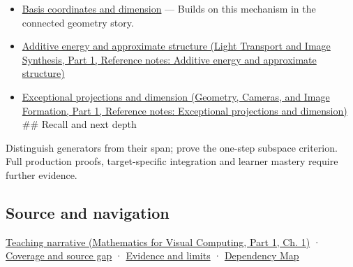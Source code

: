 \hypertarget{appendix-173b52c063ae-used-by}{}

\begin{itemize}
\item
  \hyperref[appendix-ce0341f7ea0d]{Basis coordinates and dimension} --- Builds on this mechanism in the connected geometry story.
\item
  \href{../04-Light-Transport-and-Image-Synthesis-P01/main.pdf\#nameddest=appendix-b0732b22e7d6}{Additive energy and approximate structure (Light Transport and Image Synthesis, Part 1, Reference notes: Additive energy and approximate structure)}
\item
  \href{../03-Geometry-Cameras-and-Image-Formation-P01/main.pdf\#nameddest=appendix-3c73f7862157}{Exceptional projections and dimension (Geometry, Cameras, and Image Formation, Part 1, Reference notes: Exceptional projections and dimension)} \#\# Recall and next depth
\end{itemize}

Distinguish generators from their span; prove the one-step subspace criterion. Full production proofs, target-specific integration and learner mastery require further evidence.

\subsection{Source and navigation}\label{appendix-173b52c063ae-source-and-navigation}

\hypertarget{appendix-173b52c063ae-source-and-navigation}{}

\href{../02-Mathematics-for-Visual-Computing-P01/main.pdf\#nameddest=01-foundations-i-ch017-the-reachable-movements-form-a-vector-space}{Teaching narrative (Mathematics for Visual Computing, Part 1, Ch. 1)} · \hyperref[appendix-fd090d982a15-phase-6---parts-501-600]{Coverage and source gap} · \hyperref[appendix-a103e7846d21-phase-6---source-analysis-and-verification]{Evidence and limits} · \hyperref[appendix-4ad47bdd269a]{Dependency Map}
